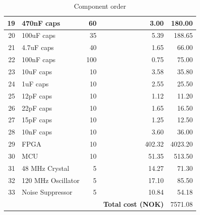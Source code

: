 \documentclass[../main/report.tex]{subfiles}
\begin{document}
\begin{table}[H]
{\begin{minipage}{\textwidth}
\begin{tabular}{| r | l | r | r | r |}
        19  &   470nF caps          & 60    & 3.00      & 180.00            \\\hline
        20  &   100uF caps          & 35    & 5.39      & 188.65            \\\hline
        21  &   4.7uF caps          & 40    & 1.65      & 66.00             \\\hline
        22  &   100nF caps          & 100   & 0.75      & 75.00             \\\hline
        23  &   10uF caps           & 10    & 3.58      & 35.80             \\\hline
        24  &   1uF caps            & 10    & 2.55      & 25.50             \\\hline
        25  &   12pF caps           & 10    & 1.12      & 11.20             \\\hline
        26  &   22pF caps           & 10    & 1.65      & 16.50             \\\hline
        27  &   15pF caps           & 10    & 1.25      & 12.50             \\\hline
        28  &   10nF caps           & 10    & 3.60      & 36.00             \\\hline
        29  &   FPGA                & 10    & 402.32    & 4023.20           \\\hline
        30  &   MCU                 & 10    & 51.35     & 513.50            \\\hline
        31  &   48 MHz Crystal      & 5     & 14.27     & 71.30             \\\hline
        32  &   120 MHz Oscillator  & 5     & 17.10     & 85.50             \\\hline
        33  &   Noise Suppressor    & 5     & 10.84     & 54.18             \\\hline
        \hline
        & &                 & \textbf{Total cost (NOK)} & 7571.08           \\\hline
    \end{tabular}
    \caption{Component order}
    \label{fig:component-order}
    \end{minipage}}
\end{table}
\end{document}
